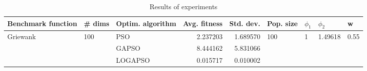 \begin{table}
\centering
\caption{Results of experiments}
\begin{tabular}{lllrrllll}
\toprule
       Benchmark function &              \# dims & Optim. algorithm &  Avg. fitness &  Std. dev. &            Pop. size &         $\phi_{1}$ &               $\phi_{2}$ &                     w \\
\midrule
\multirow{3}{*}{Griewank} & \multirow{3}{*}{100} &              PSO &      2.237203 &   1.689570 & \multirow{3}{*}{100} & \multirow{3}{*}{1} & \multirow{3}{*}{1.49618} & \multirow{3}{*}{0.55} \\
                          &                      &            GAPSO &      8.444162 &   5.831066 &                      &                    &                          &                       \\
                          &                      &          LOGAPSO &      0.015717 &   0.010002 &                      &                    &                          &                       \\
\bottomrule
\end{tabular}
\end{table}
